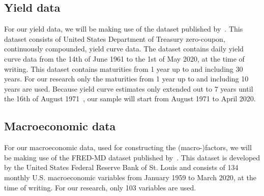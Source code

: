 \subsection{Yield data}
For our yield data, we will be making use of the dataset published by~\textcite{Grkaynak2007}. 
This dataset consists of United States Department of Treasury zero-coupon, continuously compounded, yield curve data. 
The dataset contains daily yield curve data from the 14th of June 1961 to the 1st of May 2020, at the time of writing. 
This dataset contains maturities from 1 year up to and including 30 years. 
For our research only the maturities from 1 year up to and including 10 years are used. 
Because yield curve estimates only extended out to 7 years until the 16th of August 1971~\parencite[see][p.~19]{Grkaynak2007}, our sample will start from August 1971 to April 2020. 

\subsection{Macroeconomic data}
For our macroeconomic data, used for constructing the (macro-)factors, we will be making use of the FRED-MD dataset published by~\textcite{McCracken2016}. 
This dataset is developed by the United States Federal Reserve Bank of St. Louis and consists of 134 monthly U.S. macroeconomic variables from January 1959 to March 2020, at the time of writing. 
For our research, only 103 variables are used.